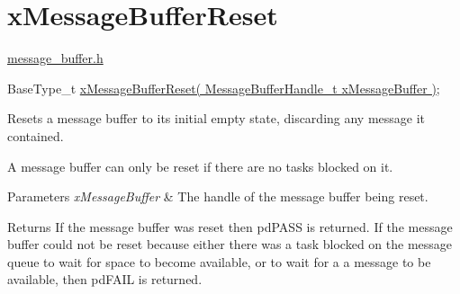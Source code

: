 \hypertarget{group__x_message_buffer_reset}{}\section{x\+Message\+Buffer\+Reset}
\label{group__x_message_buffer_reset}
\hyperlink{message__buffer_8h}{message\+\_\+buffer.\+h} 
\begin{DoxyPre}
BaseType\_t \hyperlink{message__buffer_8h_a6d22ac0fd0463b202f2e22674380a41c}{xMessageBufferReset( MessageBufferHandle\_t xMessageBuffer )};
\end{DoxyPre}


Resets a message buffer to its initial empty state, discarding any message it contained.

A message buffer can only be reset if there are no tasks blocked on it.


\begin{DoxyParams}{Parameters}
{\em x\+Message\+Buffer} & The handle of the message buffer being reset.\\
\hline
\end{DoxyParams}
\begin{DoxyReturn}{Returns}
If the message buffer was reset then pd\+P\+A\+SS is returned. If the message buffer could not be reset because either there was a task blocked on the message queue to wait for space to become available, or to wait for a a message to be available, then pd\+F\+A\+IL is returned. 
\end{DoxyReturn}
